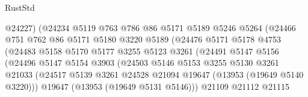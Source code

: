 \begin{lexlean}{RustStd}
\begin{coremodule}
                                  @24227)
                                (@24234
                                  @5119
                                  @763
                                  @786
                                  @86
                                  @5171
                                  @5189
                                  @5246
                                  @5264
                                  (@24466
                                    @751
                                    @762
                                    @86
                                    @5171
                                    @5180
                                    @3220
                                    @5189
                                    (@24476
                                      @5171
                                      @5178
                                      @4753
                                      (@24483
                                        @5158
                                        @5170
                                        @5177
                                        @3255
                                        @5123
                                        @3261
                                        (@24491
                                          @5147
                                          @5156
                                          (@24496
                                            @5147
                                            @5154
                                            @3903
                                            (@24503
                                              @5146
                                              @5153
                                              @3255
                                              @5130
                                              @3261
                                              @21033
                                              (@24517
                                                @5139
                                                @3261
                                                @24528
                                                @21094
                                                @19647
                                                (@13953 (@19649 @5140 @3220)))
                                              @19647
                                              (@13953 (@19649 @5131 @5146)))
                                            @21109
                                            @21112
                                            @21115

\end{coremodule}
\end{lexlean}
